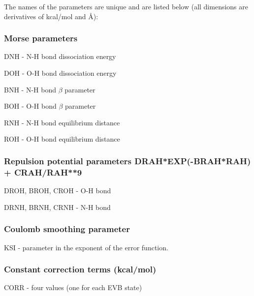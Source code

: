 \documentclass[oneside,11pt,openany]{book}
\newcommand{\tw}{\ttfamily}
\begin{document}
\begin{description}
\item {\tw <Parameter name>} {\tw <numerical value>}
\end{description}

\noindent The names of the parameters are unique and are
listed below (all dimensions are derivatives of kcal/mol and \AA):

\subsubsection*{Morse parameters}
\begin{description}
\item {\tw DNH} - N-H bond dissociation energy
\item {\tw DOH} - O-H bond dissociation energy
\item {\tw BNH} - N-H bond $\beta$ parameter
\item {\tw BOH} - O-H bond $\beta$ parameter
\item {\tw RNH} - N-H bond equilibrium distance
\item {\tw ROH} - O-H bond equilibrium distance
\end{description}

\subsubsection*{Repulsion potential parameters 
                {\tw DRAH*EXP(-BRAH*RAH) + CRAH/RAH**9}}
\begin{description}
\item {\tw DROH, BROH, CROH} - O-H bond
\item {\tw DRNH, BRNH, CRNH} - N-H bond
\end{description}

\subsubsection*{Coulomb smoothing parameter}
\begin{description}
\item {\tw KSI} - parameter in the exponent of the error function.
\end{description}

\subsubsection*{Constant correction terms (kcal/mol)}
\begin{description}
\item {\tw CORR} - four values (one for each EVB state)
\end{description}
\end{document}
